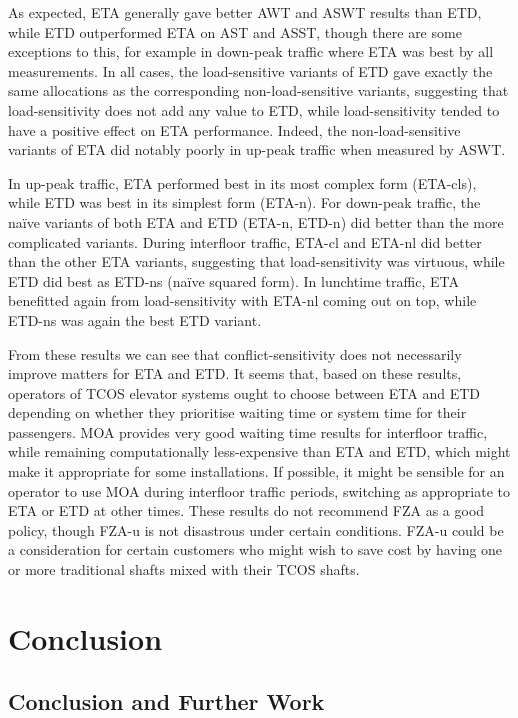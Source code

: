 \documentclass{UoYCSproject}
\begin{document}
As expected, ETA generally gave better AWT and ASWT results than ETD, while ETD outperformed ETA on AST and ASST, though there are some exceptions to this, for example in down-peak traffic where ETA was best by all measurements.  In all cases, the load-sensitive variants of ETD gave exactly the same allocations as the corresponding non-load-sensitive variants, suggesting that load-sensitivity does not add any value to ETD, while load-sensitivity tended to have a positive effect on ETA performance.  Indeed, the non-load-sensitive variants of ETA did notably poorly in up-peak traffic when measured by ASWT.

In up-peak traffic, ETA performed best in its most complex form (ETA-cls), while ETD was best in its simplest form (ETA-n).  For down-peak traffic, the na\"{i}ve variants of both ETA and ETD (ETA-n, ETD-n) did better than the more complicated variants.  During interfloor traffic, ETA-cl and ETA-nl did better than the other ETA variants, suggesting that load-sensitivity was virtuous, while ETD did best as ETD-ns (na\"{i}ve squared form).  In lunchtime traffic, ETA benefitted again from load-sensitivity with ETA-nl coming out on top, while ETD-ns was again the best ETD variant.

From these results we can see that conflict-sensitivity does not necessarily improve matters for ETA and ETD.  It seems that, based on these results, operators of TCOS elevator systems ought to choose between ETA and ETD depending on whether they prioritise waiting time or system time for their passengers.  MOA provides very good waiting time results for interfloor traffic, while remaining computationally less-expensive than ETA and ETD, which might make it appropriate for some installations.  If possible, it might be sensible for an operator to use MOA during interfloor traffic periods, switching as appropriate to ETA or ETD at other times.  These results do not recommend FZA as a good policy, though FZA-u is not disastrous under certain conditions.  FZA-u could be a consideration for certain customers who might wish to save cost by having one or more traditional shafts mixed with their TCOS shafts.

\part{Conclusion}

\chapter{Conclusion and Further Work}
\end{document}
